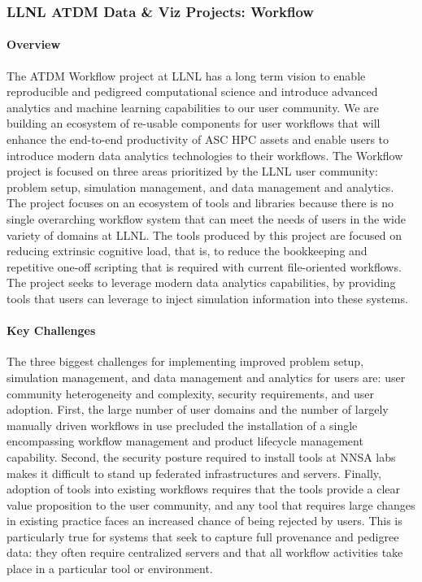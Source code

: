 \subsubsection{ LLNL ATDM Data \& Viz Projects: Workflow}

\paragraph{Overview} 

The ATDM Workflow project at LLNL has a long term vision to enable reproducible
and pedigreed computational science and introduce advanced analytics and machine
learning capabilities to our user community. We are building an
ecosystem of re-usable components for user workflows that will enhance the
end-to-end productivity of ASC HPC assets and enable users to introduce modern
data analytics technologies to their workflows. The Workflow project is focused
on three areas prioritized by the LLNL user community: problem setup, simulation
management, and data management and analytics. The project focuses on an
ecosystem of tools and libraries because there is no single overarching
workflow system that can meet the needs of users in the wide variety of domains
at LLNL. The tools produced by this project are focused on reducing extrinsic
cognitive load, that is, to reduce the bookkeeping and repetitive one-off
scripting that is required with current file-oriented workflows. The project
seeks to leverage modern data analytics capabilities, by providing tools that
users can leverage to inject simulation information into these systems. 

\paragraph{Key Challenges}

The three biggest challenges for implementing improved problem setup,
simulation management, and data management and analytics for users are: user
community heterogeneity and complexity, security requirements, and user
adoption. First, the large number of user domains and the number of largely
manually driven workflows in use precluded the installation of a single
encompassing workflow management and product lifecycle management capability.
Second, the security posture required to install tools at NNSA labs makes it
difficult to stand up federated infrastructures and servers.  Finally, adoption
of tools into existing workflows requires that the tools provide a clear value
proposition to the user community, and any tool that requires large changes in
existing practice faces an increased chance of being rejected by users. This is
particularly true for systems that seek to capture full provenance and pedigree
data: they often require centralized servers and that all workflow activities
take place in a particular tool or environment.


